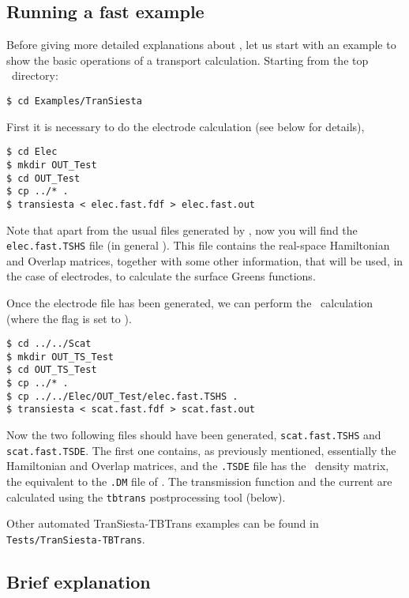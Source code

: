 \subsection{Running a fast example}

Before giving more detailed explanations about \tsiesta, let
us start with an example to show the basic operations of a transport
calculation.  Starting from the top \siesta\ directory:

\begin{verbatim}
$ cd Examples/TranSiesta
\end{verbatim}

First it is necessary to do the electrode calculation (see below for
details),

\begin{verbatim}
$ cd Elec
$ mkdir OUT_Test
$ cd OUT_Test
$ cp ../* .
$ transiesta < elec.fast.fdf > elec.fast.out
\end{verbatim}

Note that apart from the usual files generated by \siesta, now you will 
find the \texttt{elec.fast.TSHS} file (in general ). 
This file contains the real-space Hamiltonian and Overlap matrices, together 
with some other information, that will be used, in the case of electrodes, to 
calculate the surface Greens functions. 

Once the electrode file has been generated, we can perform the \tsiesta\ 
calculation (where the  flag is set
to ).

\begin{verbatim}
$ cd ../../Scat
$ mkdir OUT_TS_Test
$ cd OUT_TS_Test
$ cp ../* .
$ cp ../../Elec/OUT_Test/elec.fast.TSHS .
$ transiesta < scat.fast.fdf > scat.fast.out
\end{verbatim}

Now the two following files should have been generated, \texttt{scat.fast.TSHS} 
and \texttt{scat.fast.TSDE}. The first one contains, as previously mentioned, 
essentially the Hamiltonian and Overlap matrices, and the \texttt{.TSDE} file 
has the \tsiesta\ density matrix, the equivalent to the \texttt{.DM} 
file of \siesta. The transmission function and the current are calculated 
using the \texttt{tbtrans} postprocessing tool (below).

Other automated TranSiesta-TBTrans examples can be found in
\texttt{Tests/TranSiesta-TBTrans}.

\subsection{Brief explanation}

